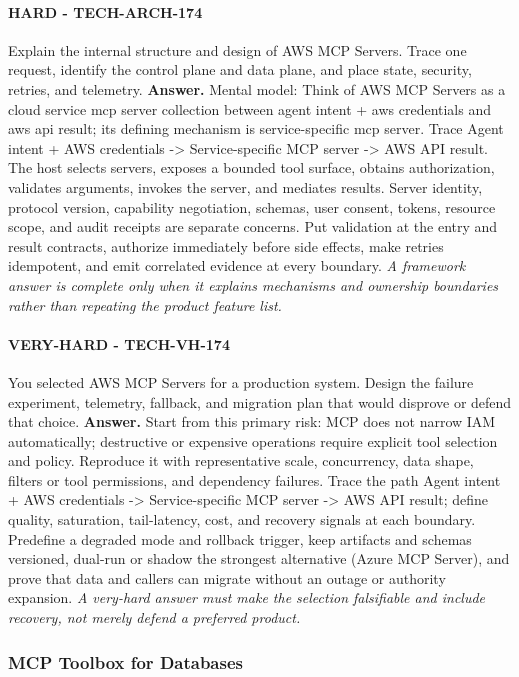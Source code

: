 \paragraph{HARD - TECH-ARCH-174} Explain the internal structure and design of AWS MCP Servers. Trace one request, identify the control plane and data plane, and place state, security, retries, and telemetry.
\textbf{Answer.} Mental model: Think of AWS MCP Servers as a cloud service mcp server collection between agent intent + aws credentials and aws api result; its defining mechanism is service-specific mcp server. Trace Agent intent + AWS credentials -> Service-specific MCP server -> AWS API result. The host selects servers, exposes a bounded tool surface, obtains authorization, validates arguments, invokes the server, and mediates results. Server identity, protocol version, capability negotiation, schemas, user consent, tokens, resource scope, and audit receipts are separate concerns. Put validation at the entry and result contracts, authorize immediately before side effects, make retries idempotent, and emit correlated evidence at every boundary.
\textit{A framework answer is complete only when it explains mechanisms and ownership boundaries rather than repeating the product feature list.}
\paragraph{VERY-HARD - TECH-VH-174} You selected AWS MCP Servers for a production system. Design the failure experiment, telemetry, fallback, and migration plan that would disprove or defend that choice.
\textbf{Answer.} Start from this primary risk: MCP does not narrow IAM automatically; destructive or expensive operations require explicit tool selection and policy. Reproduce it with representative scale, concurrency, data shape, filters or tool permissions, and dependency failures. Trace the path Agent intent + AWS credentials -> Service-specific MCP server -> AWS API result; define quality, saturation, tail-latency, cost, and recovery signals at each boundary. Predefine a degraded mode and rollback trigger, keep artifacts and schemas versioned, dual-run or shadow the strongest alternative (Azure MCP Server), and prove that data and callers can migrate without an outage or authority expansion.
\textit{A very-hard answer must make the selection falsifiable and include recovery, not merely defend a preferred product.}
\subsubsection*{MCP Toolbox for Databases}
